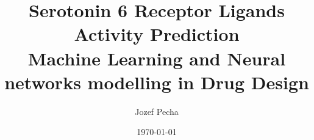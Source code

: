 \documentclass[12pt, twoside]{article}
\title{Serotonin 6 Receptor Ligands Activity Prediction \\
        
        \large Machine Learning and Neural networks modelling in Drug Design}
\author{Jozef Pecha}
\date{\today}
\begin{document}
\begin{titlepage}
\maketitle
\end{titlepage}

\tableofcontents
\end{document}
